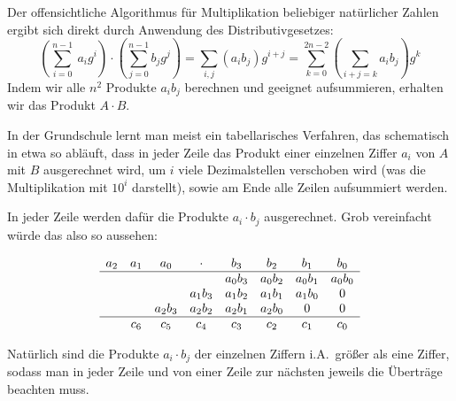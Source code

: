 \begin{remark}
    Der offensichtliche Algorithmus für Multiplikation beliebiger natürlicher Zahlen ergibt sich direkt durch Anwendung des Distributivgesetzes:
    \[\left(\sum_{i=0}^{n-1}\ a_i g^i \right)\cdot\left(\sum_{j=0}^{n-1} b_j g^j\right) = \sum_{i,j} (a_i b_j) g^{i+j} = \sum_{k=0}^{2n-2} \left(\sum_{i+j=k}a_i b_j\right)g^k\]
    Indem wir alle $n^2$ Produkte $a_i b_j$ berechnen und geeignet aufsummieren, erhalten wir das Produkt $A\cdot B$.

    \medskip
    In der Grundschule lernt man meist ein tabellarisches Verfahren, das schematisch in etwa so abläuft, dass in jeder Zeile das Produkt einer einzelnen Ziffer $a_i$ von $A$ mit $B$ ausgerechnet wird, um $i$ viele Dezimalstellen verschoben wird (was die Multiplikation mit $10^i$ darstellt), sowie am Ende alle Zeilen aufsummiert werden.

    \smallskip
    In jeder Zeile werden dafür die Produkte $a_i\cdot b_j$ ausgerechnet. Grob vereinfacht würde das also so aussehen:

    \[\begin{array}{c c c c c c c c}
        a_2 & a_1 & a_0     & \cdot   & b_3     & b_2     & b_1     & b_0     \\
        \hline
        &     &         &         & a_0 b_3 & a_0 b_2 & a_0 b_1 & a_0 b_0 \\
        &     &         & a_1 b_3 & a_1 b_2 & a_1 b_1 & a_1 b_0 & 0       \\
        &     & a_2 b_3 & a_2 b_2 & a_2 b_1 & a_2 b_0 & 0       & 0       \\
        \hline
        & c_6 & c_5     & c_4     & c_3     & c_2     & c_1     & c_0
    \end{array}\]

    Natürlich sind die Produkte $a_i\cdot b_j$ der einzelnen Ziffern i.A.\ größer als eine Ziffer, sodass man in jeder Zeile und von einer Zeile zur nächsten jeweils die Überträge beachten muss.
\end{remark}

